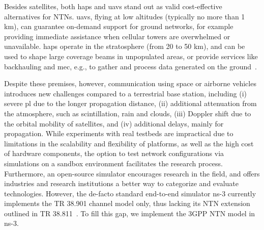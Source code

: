 Besides satellites, both \glspl{hap} and \glspl{uav} stand out as valid cost-effective alternatives for NTNs. 
\glspl{uav}, flying at low altitudes (typically no more than 1 km), can guarantee on-demand support for ground networks, for example providing immediate assistance when cellular towers are overwhelmed or unavailable. \glspl{hap} operate in the stratosphere (from 20 to 50 km), and can be used to shape large coverage beams in  unpopulated areas, or provide services like backhauling and \gls{mec}, e.g., to gather and process data generated on the ground~\cite{traspadini2023real,wang2020potential}. %

Despite these premises, however, communication using space or airborne vehicles introduces new challenges compared to a terrestrial base station, including (i) severe \gls{pl} due to the longer propagation distance, (ii) additional attenuation from the atmosphere, such as scintillation, rain and clouds, (iii) Doppler shift due to the orbital mobility of satellites, and (iv) additional delays, mainly for propagation.
While experiments with real testbeds are impractical due to limitations in the scalability and flexibility of platforms, as well as the high cost of hardware components, the option to test network configurations via simulations on a sandbox environment facilitates the research process. Furthermore, an open-source simulator encourages research in the field, and offers industries and research institutions a better way to categorize and evaluate technologies. 
However, the de-facto standard end-to-end simulator ns-3 currently implements the TR 38.901 channel model only, thus lacking its NTN extension outlined in TR 38.811~\cite{38811}. 
To fill this gap, we implement the 3GPP NTN model in ns-3.


